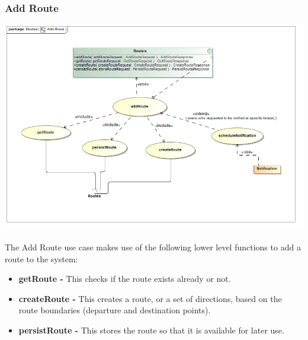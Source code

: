 \documentclass[a4paper,12pt]{article}
\begin{document}
\subsubsection{Add Route}
\includegraphics[width=\textwidth]{images/Add_Route.jpg}

The Add Route use case makes use of the following lower level functions to add a route to the system:
\begin{itemize}
\item \textbf{getRoute -} This checks if the route exists already or not.
\item \textbf{createRoute -} This creates a route, or a set of directions, based on the route boundaries (departure and destination points).
\item \textbf{persistRoute -} This stores the route so that it is available for later use.
\end{itemize}
\end{document}
